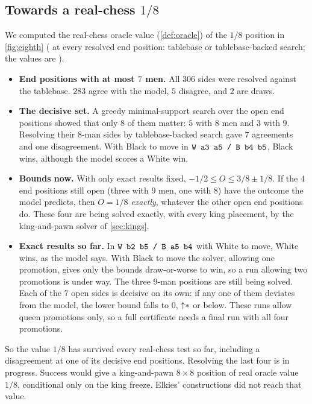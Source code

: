 \subsection{Towards a real-chess $1/8$}\label{sec:eighth-real}
We computed the real-chess oracle value (\cref{def:oracle}) of the $1/8$ position in \cref{fig:eighth}
( at every resolved end position: tablebase or tablebase-backed search; the values are
).
\begin{itemize}
\item \textbf{End positions with at most $7$ men.} All $306$ sides were resolved against the tablebase. $283$
  agree with the model, $5$ disagree, and $2$ are draws.
\item \textbf{The decisive set.} A greedy minimal-support search over the open end positions showed that only
  $8$ of them matter: $5$ with $8$ men and $3$ with $9$. Resolving their $8$-man sides by tablebase-backed search
  gave $7$ agreements and one disagreement. With Black to move in $\texttt{W a3 a5 / B b4 b5}$, Black wins,
  although the model scores a White win.
\item \textbf{Bounds now.} With only exact results fixed, $-1/2\le O\le 3/8\pm1/8$. If the $4$ end positions
  still open (three with $9$ men, one with $8$) have the outcome the model predicts, then $O=1/8$
  \emph{exactly}, whatever the other open end positions do. These four are being solved exactly, with every
  king placement, by the king-and-pawn solver of \cref{sec:kings}.
\item \textbf{Exact results so far.} In $\texttt{W b2 b5 / B a5 b4}$ with White to move, White wins, as the model
  says. With Black to move the solver, allowing one promotion, gives only the bounds draw-or-worse to win, so
  a run allowing two promotions is under way. The three $9$-man positions are still being solved. Each of the
  $7$ open sides is decisive on its own: if any one of them deviates from the model, the lower bound falls to
  $0$, $\mathord{\uparrow}\mathord{\ast}$ or below. These runs allow queen promotions only, so a full certificate needs a final run
  with all four promotions.
\end{itemize}
So the value $1/8$ has survived every real-chess test so far, including a disagreement at one of its decisive
end positions. Resolving the last four is in progress. Success would give a king-and-pawn $8\times8$ position of
real oracle value $1/8$, conditional only on the king freeze. Elkies' constructions did not reach that value.
